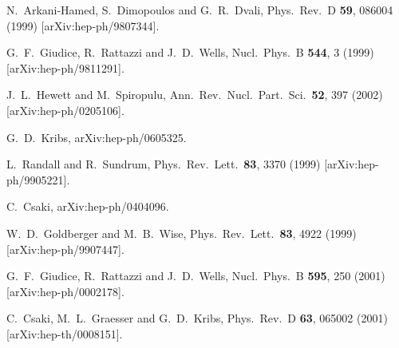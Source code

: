 \documentclass[12pt]{article}
\begin{document}
\begin{thebibliography}{9}
  N.~Arkani-Hamed, S.~Dimopoulos and G.~R.~Dvali,
  Phys.\ Rev.\  D {\bf 59}, 086004 (1999)
  [arXiv:hep-ph/9807344].

  G.~F.~Giudice, R.~Rattazzi and J.~D.~Wells,
  Nucl.\ Phys.\  B {\bf 544}, 3 (1999)
  [arXiv:hep-ph/9811291].



  J.~L.~Hewett and M.~Spiropulu,
  Ann.\ Rev.\ Nucl.\ Part.\ Sci.\  {\bf 52}, 397 (2002)
  [arXiv:hep-ph/0205106].



  G.~D.~Kribs,
  arXiv:hep-ph/0605325.

  L.~Randall and R.~Sundrum,
  Phys.\ Rev.\ Lett.\  {\bf 83}, 3370 (1999)
  [arXiv:hep-ph/9905221].
  
  C.~Csaki,
  arXiv:hep-ph/0404096.
  


  W.~D.~Goldberger and M.~B.~Wise,
  Phys.\ Rev.\ Lett.\  {\bf 83}, 4922 (1999)
  [arXiv:hep-ph/9907447].

  G.~F.~Giudice, R.~Rattazzi and J.~D.~Wells,
  Nucl.\ Phys.\  B {\bf 595}, 250 (2001)
  [arXiv:hep-ph/0002178].

  C.~Csaki, M.~L.~Graesser and G.~D.~Kribs,
  Phys.\ Rev.\  D {\bf 63}, 065002 (2001)
  [arXiv:hep-th/0008151].


\end{thebibliography}
\end{document}
